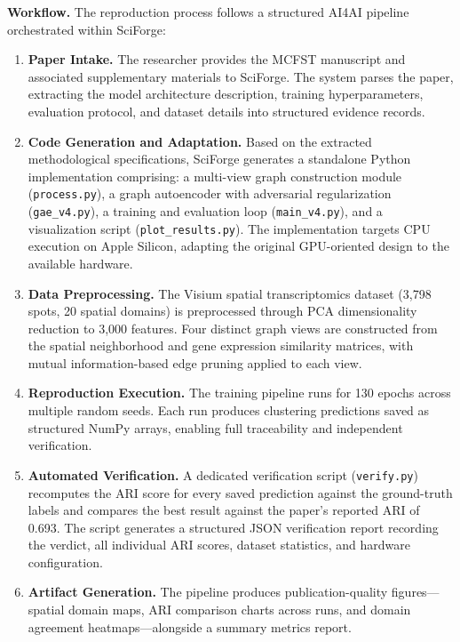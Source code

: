 \documentclass[sn-basic,Numbered,pdflatex]{sn-jnl}
\begin{document}
\textbf{Workflow.} The reproduction process follows a structured AI4AI pipeline orchestrated within SciForge:
\begin{enumerate}
    \item \textbf{Paper Intake.} The researcher provides the MCFST manuscript and associated supplementary materials to SciForge. The system parses the paper, extracting the model architecture description, training hyperparameters, evaluation protocol, and dataset details into structured evidence records.
    \item \textbf{Code Generation and Adaptation.} Based on the extracted methodological specifications, SciForge generates a standalone Python implementation comprising: a multi-view graph construction module (\texttt{process.py}), a graph autoencoder with adversarial regularization (\texttt{gae\_v4.py}), a training and evaluation loop (\texttt{main\_v4.py}), and a visualization script (\texttt{plot\_results.py}). The implementation targets CPU execution on Apple Silicon, adapting the original GPU-oriented design to the available hardware.
    \item \textbf{Data Preprocessing.} The Visium spatial transcriptomics dataset (3,798 spots, 20 spatial domains) is preprocessed through PCA dimensionality reduction to 3,000 features. Four distinct graph views are constructed from the spatial neighborhood and gene expression similarity matrices, with mutual information-based edge pruning applied to each view.
    \item \textbf{Reproduction Execution.} The training pipeline runs for 130 epochs across multiple random seeds. Each run produces clustering predictions saved as structured NumPy arrays, enabling full traceability and independent verification.
    \item \textbf{Automated Verification.} A dedicated verification script (\texttt{verify.py}) recomputes the ARI score for every saved prediction against the ground-truth labels and compares the best result against the paper's reported ARI of 0.693. The script generates a structured JSON verification report recording the verdict, all individual ARI scores, dataset statistics, and hardware configuration.
    \item \textbf{Artifact Generation.} The pipeline produces publication-quality figures---spatial domain maps, ARI comparison charts across runs, and domain agreement heatmaps---alongside a summary metrics report.
\end{enumerate}
\end{document}
